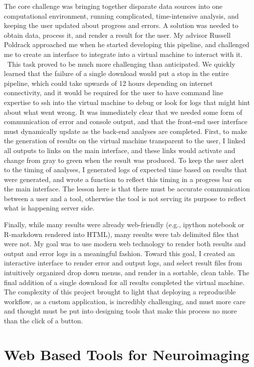\documentclass{report}
\begin{document}
The core challenge was bringing together disparate data sources into one
computational environment, running complicated, time-intensive analysis,
and keeping the user updated about progress and errors. A solution was
needed to obtain data, process it, and render a result for the user. My
advisor Russell Poldrack approached me when he started developing this
pipeline, and challenged me to create an interface to integrate into a
virtual machine to interact with it. ~This task proved to be much more
challenging than anticipated. We quickly learned that the failure of a
single download would put a stop in the entire pipeline, which could
take upwards of 12 hours depending on internet connectivity, and it
would be required for the user to have command line expertise to ssh
into the virtual machine to debug or look for logs that might hint about
what went wrong. It was immediately clear that we needed some form of
communication of error and console output, and that the front-end user
interface must dynamically update as the back-end analyses are
completed. First, to make the generation of results on the virtual
machine transparent to the user, I linked all outputs to links on the
main interface, and these links would activate and change from gray to
green when the result was produced. To keep the user alert to the timing
of analyses, I generated logs of expected time based on results that
were generated, and wrote a function to reflect this timing in a
progress bar on the main interface. The lesson here is that there must
be accurate communication between a user and a tool, otherwise the tool
is not serving its purpose to reflect what is happening server side.

Finally, while many results were already web-friendly (e.g., ipython
notebook or R-markdown rendered into HTML), many results were tab
delimited files that were not. My goal was to use modern web technology
to render both results and output and error logs in a meaningful
fashion. Toward this goal, I created an interactive interface to render
error and output logs, and select result files from intuitively
organized drop down menus, and render in a sortable, clean table. The
final addition of a single download for all results completed the
virtual machine. The complexity of this project brought to light that
deploying a reproducible workflow, as a custom application, is
incredibly challenging, and must more care and thought must be put into
designing tools that make this process no more than the click of a
button.

\section{Web Based Tools for Neuroimaging}
\end{document}
